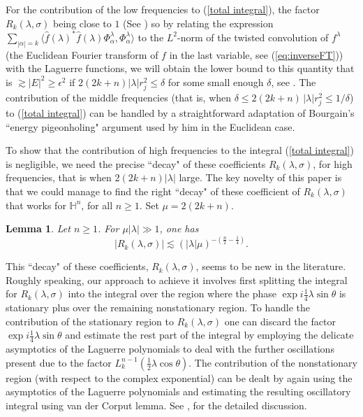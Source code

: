 \documentclass[11pt, reqno]{amsart}
\theoremstyle{plain}
\newtheorem{lemma}[theorem]{Lemma}
\theoremstyle{remark}
\theoremstyle{example}
\theoremstyle{definition}
\numberwithin{equation}{section}
\def\H{\mathbb{H}}
\begin{document}
For the contribution of the low  frequencies to (\ref{total integral}), the factor $R_{k}(\lambda, \sigma)$ being close to $1$ (See ) so by relating the expression $\sum_{|\alpha|=k} \langle \hat{f}(\lambda)^{*} \hat{f}(\lambda) \Phi_{\alpha}^{\lambda},\Phi_{\alpha}^{\lambda} \rangle$ to the $L^{2}$-norm of the twisted convolution of $f^{\lambda}$ (the Euclidean Fourier transform of $f$ in the last variable, see (\ref{eq:inverseFT})) with the Laguerre functions, we will obtain the lower bound to this quantity that is  $\gtrsim |E|^2 \geq \epsilon^2$ if $2(2k+n)|\lambda|r_{j}^2 \leq \delta$ for some small enough $\delta$, see .  The contribution of the middle frequencies (that is, when $ \delta \leq 2(2k+n) \, |\lambda| r_{j}^2 \leq 1/ \delta $) to (\ref{total integral}) can be handled by a straightforward adaptation of Bourgain's ``energy pigeonholing" argument used by him in the Euclidean case.





To show that the contribution  of high frequencies  to the integral (\ref{total integral}) is negligible, we need the precise ``decay" of these coefficients $R_{k}(\lambda, \sigma)$, for high frequencies, that is when $ 2(2k+n) |\lambda|$ large. The key novelty of this paper is that we could manage to find the right ``decay" of these  coefficient of $R_{k}(\lambda, \sigma)$ that works for $\H^n$, for all $n \geq 1$. Set $\mu = 2(2k+n)$.
\begin{lemma} \label{coeff. surface measure}
    Let $n \geq 1$. For $\mu |\lambda| \gg 1$, one has
    \begin{equation}
        | R_{k}(\lambda, \sigma) | \lesssim ( |\lambda| \mu )^{-( \frac{n}{2} - \frac{1}{4} )}.
    \end{equation}
\end{lemma}
This ``decay" of these coefficients, $R_{k}(\lambda, \sigma)$,  seems to be new in the literature. Roughly speaking, our approach to achieve it involves first splitting the integral for $R_{k}(\lambda, \sigma)$ into  the integral over the region where the  phase  $\exp{\textstyle i \frac{1}{4} \lambda \sin{ \theta}}$ is stationary plus over the remaining  nonstationary region. To handle the contribution of the stationary region to $R_{k}(\lambda, \sigma)$ one can discard the factor $\exp{\textstyle i \frac{1}{4} \lambda \sin{ \theta}}$ and estimate the rest part of the integral by employing the  delicate asymptotics of the Laguerre polynomials to deal with the further oscillations present due to the factor  $L_{k}^{n-1}( \frac{1}{2} \lambda \cos{ \theta} )$. The contribution of the nonstationary region (with respect to the complex exponential) can be dealt by again using the asymptotics of the Laguerre polynomials and estimating the resulting oscillatory integral using van der Corput lemma. See , for the detailed discussion.
\end{document}
